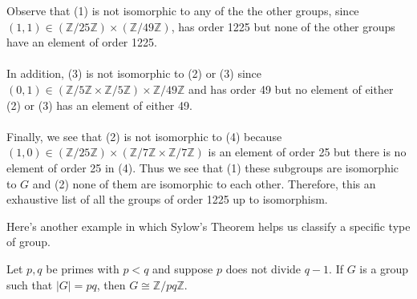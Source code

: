     Observe that (1)
    is not isomorphic to any of the the other groups, since $(1, 1)
    \in (\mathbb{Z}/25\mathbb{Z}) \times (\mathbb{Z}/49\mathbb{Z})$,
    has order 1225 but none of the other groups have an element of
    order 1225.
    \\
    \\
    In addition, (3) is not isomorphic to (2) or (3) since $(0, 1) \in
    (\mathbb{Z}/5\mathbb{Z} \times \mathbb{Z}/5\mathbb{Z})
        \times \mathbb{Z}/49\mathbb{Z}$ and has
    order 49
    but no element of either (2) or (3) has an element of either 49. 
    \\
    \\
    Finally, we see that (2) is not isomorphic to (4) because $(1, 0)
    \in (\mathbb{Z}/25\mathbb{Z}) \times
    (\mathbb{Z}/7\mathbb{Z} \times \mathbb{Z}/7\mathbb{Z})$ is an
    element of order 25 but there is no element of order 25 in (4).
    Thus we see that (1) these subgroups are isomorphic to $G$ and (2)
    none of them are isomorphic to each other. Therefore, this an
    exhaustive list of all the groups of order 1225 up to isomorphism.

    Here's another example in which Sylow's Theorem helps us classify
    a specific type of group.

    \begin{thm}
        Let $p,q$ be primes with $p<q$ and suppose $p$ does not divide
        $q-1$.  If $G$ is a group such that $|G| = pq$, then 
        $G \cong \mathbb{Z}/pq\mathbb{Z}$. 
    \end{thm}

